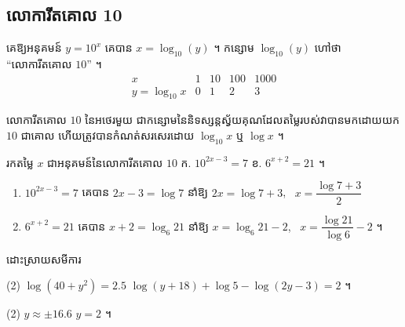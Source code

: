 \subsection{លោការីតគោល 10}

\begin{example}[ឧទាហរណ៍]
គេឱ្យអនុគមន៍ $y = 10^x$ គេបាន $x = \log_{10}(y)$ ។ កន្សោម $\log_{10}(y)$ ហៅថា ``លោការីតគោល $10$'' ។
\[
\begin{array}{c|cccc}
x & 1 & 10 & 100 & 1000\\ \hline
y = \log_{10} x & 0 & 1 & 2 & 3
\end{array}
\]
\begin{center}
\end{center}
\end{example}

\begin{definition}
លោការីតគោល $10$ នៃអថេរមួយ ជាកន្សោមនៃនិទស្សន្តស្វ័យគុណដែលតម្លៃរបស់វាបានមកដោយយក $10$ ជាគោល ហើយត្រូវបានកំណត់សរសេរដោយ $\log_{10} x$ ឬ $\log x$ ។
\end{definition}

\begin{example}[លំហាត់គំរូ ៤]
រកតម្លៃ $x$ ជាអនុគមន៍នៃលោការីតគោល $10$ \quad ក. $10^{2x-3} = 7$ \qquad ខ. $6^{x+2} = 21$ ។
\end{example}
\ans
\begin{enumerate}[a]
  \item $10^{2x-3} = 7$ គេបាន $2x - 3 = \log 7$ នាំឱ្យ $2x = \log 7 + 3$, \ $x = \dfrac{\log 7 + 3}{2}$
  \item $6^{x+2} = 21$ គេបាន $x + 2 = \log_6 21$ នាំឱ្យ $x = \log_6 21 - 2$, \ $x = \dfrac{\log 21}{\log 6} - 2$ ។
\end{enumerate}

\begin{pro}
ដោះស្រាយសមីការ
\begin{tasks}(2)
  \task $\log(40 + y^2) = 2.5$
  \task $\log(y + 18) + \log 5 - \log(2y - 3) = 2$ ។
\end{tasks}
\ans
\begin{tasks}(2)
  \task $y \approx \pm 16.6$
  \task $y = 2$ ។
\end{tasks}
\end{pro}


